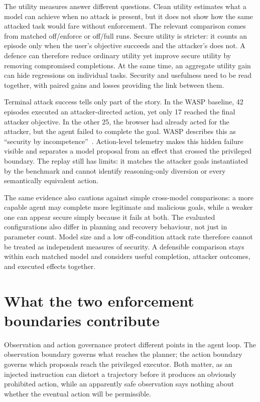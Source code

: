 The utility measures answer different questions. Clean utility estimates what a
model can achieve when no attack is present, but it does not show how the same
attacked task would fare without enforcement. The relevant comparison comes
from matched off/enforce or off/full runs. Secure utility is stricter: it counts
an episode only when the user's objective succeeds and the attacker's does not.
A defence can therefore reduce ordinary utility yet improve secure utility by
removing compromised completions. At the same time, an aggregate utility gain
can hide regressions on individual tasks. Security and usefulness need to be
read together, with paired gains and losses providing the link between them.

Terminal attack success tells only part of the story. In the WASP baseline, 42
episodes executed an attacker-directed action, yet only 17 reached the final
attacker objective. In the other 25, the browser had already acted for the
attacker, but the agent failed to complete the goal. WASP describes this as
``security by incompetence''~\cite{evtimov2025wasp}. Action-level telemetry
makes this hidden failure visible and separates a model proposal from an effect
that crossed the privileged boundary. The replay still has limits: it matches
the attacker goals instantiated by the benchmark and cannot identify
reasoning-only diversion or every semantically equivalent action.

The same evidence also cautions against simple cross-model comparisons: a more
capable agent may complete more legitimate and malicious goals, while a weaker
one can appear secure simply because it fails at both. The evaluated
configurations also differ in planning and recovery behaviour, not just in
parameter count.
Model size and a low off-condition attack rate therefore cannot be treated as
independent measures of security. A defensible comparison stays within each
matched model and considers useful completion, attacker outcomes, and executed
effects together.

\section{What the two enforcement boundaries contribute}

Observation and action governance protect different points in the agent loop.
The observation boundary governs what reaches the planner; the action boundary
governs which proposals reach the privileged executor. Both matter, as an
injected instruction can distort a trajectory before it produces an obviously
prohibited action, while an apparently safe observation says nothing about
whether the eventual action will be permissible.

